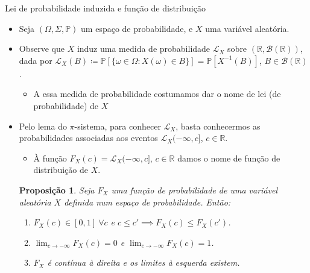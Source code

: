 \documentclass[11pt]{beamer}
\newtheorem{proposition}{Proposição}
\begin{document}
\begin{frame}{Lei de probabilidade induzida e função de distribuição}
	\begin{itemize}
	\item 	Seja $(\Omega, \Sigma, \mathbb{P} )$ um espaço de probabilidade, e $X$ uma variável aleatória.
	\item Observe que $X$ induz uma medida de probabilidade $\mathcal{L}_X$ sobre $(\mathbb{R},\mathcal{B}(\mathbb{R}))$, dada por $\mathcal{\mathcal{L}}_X(B)\coloneqq  \mathbb{P}[\{\omega \in \Omega: X(\omega) \in B\}] = \mathbb{P}[X^{-1}(B)]$, $B \in \mathcal{B}(\mathbb{R})$.
	\begin{itemize}
		\item A essa medida de probabilidade costumamos dar o nome de lei (de probabilidade) de $X$
	\end{itemize}
	\item Pelo lema do $\pi$-sistema, para conhecer $\mathcal{L}_X$, basta conhecermos as probabilidades associadas aos eventos $\mathcal{L}_X(-\infty,c]$, $c \in \mathbb{R}$.
	\begin{itemize}
		\item À função $F_X(c) = \mathcal{L}_X(-\infty,c]$, $c \in \mathbb{R}$ damos o nome de {\color{blue}função de distribuição de $X$}.
\end{itemize}
\begin{proposition}
	Seja $F_X$ uma função de probabilidade de uma variável aleatória $X$ definida num espaço de probabilidade. Então:
	\begin{enumerate}
		\item $F_X(c) \in [0,1]\  \forall c$ e $c \leq c'\implies F_X(c) \leq F_X(c')$.
		\item $\lim_{c \to - \infty}F_X(c) =0$ e $\lim_{c \to - \infty}F_X(c) =1$.
		\item $F_X$ é contínua à direita e os limites à esquerda existem.
	\end{enumerate}
\end{proposition}
\end{itemize}
\end{frame}
\end{document}
